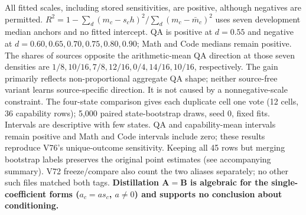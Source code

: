\begin{table}[!htbp]
\par\smallskip
\begin{minipage}{0.99\linewidth}\footnotesize All fitted scales, including stored sensitivities, are positive, although negatives are permitted. $R^2=1-\sum_d(m_c-s_ch)^2/\sum_d(m_c-\bar m_c)^2$ uses seven development median anchors and no fitted intercept. QA is positive at $d=0.55$ and negative at $d=0.60,0.65,0.70,0.75,0.80,0.90$; Math and Code medians remain positive. The shares of sources opposite the arithmetic-mean QA direction at those seven densities are $1/8,10/16,7/8,12/16,0/4,14/16,10/16$, respectively. The gain primarily reflects non-proportional aggregate QA shape; neither source-free variant learns source-specific direction. It is not caused by a nonnegative-scale constraint. The four-state comparison gives each duplicate cell one vote (12 cells, 36 capability rows); 5,000 paired state-bootstrap draws, seed 0, fixed fits. Intervals are descriptive with few states. QA and capability-mean intervals remain positive and Math and Code intervals include zero; these results reproduce V76's unique-outcome sensitivity. Keeping all 45 rows but merging bootstrap labels preserves the original point estimates (see accompanying summary). V72 freeze/compare also count the two aliases separately; no other such files matched both tags. \textbf{Distillation A$=$B is algebraic for the single-coefficient forms ($a_c=a s_c$, $a\ne0$) and supports no conclusion about conditioning.} \end{minipage}
\end{table}
